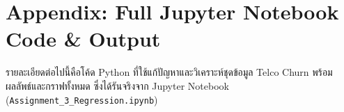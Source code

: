 \documentclass[12pt,a4paper]{article}
\begin{document}
\clearpage
\appendix
\section*{Appendix: Full Jupyter Notebook Code \& Output}

รายละเอียดต่อไปนี้คือโค้ด Python ที่ใช้แก้ปัญหาและวิเคราะห์ชุดข้อมูล Telco Churn พร้อมผลลัพธ์และกราฟทั้งหมด ซึ่งได้รันจริงจาก Jupyter Notebook (\texttt{Assignment\_3\_Regression.ipynb})


\end{document}
